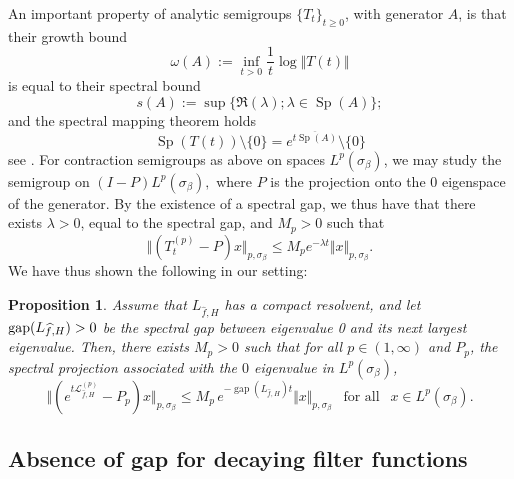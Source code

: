 \documentclass[11pt]{amsart}
\newcommand{\1}{\mathbbm{1}}
\newcommand{\cL}{\mathcal{L}}
\theoremstyle{plain}
\newtheorem{proposition}[theorem]{Proposition}
\theoremstyle{definition}
\theoremstyle{remark}
\numberwithin{equation}{section}
\begin{document}
\noindent An important property of analytic semigroups $\{T_t\}_{t\ge 0}$, with generator $A$, is that their growth bound
\[\omega(A):=\inf_{t>0} \frac{1}{t} \log \Vert T(t)\Vert\]
is equal to their spectral bound 
\[ s(A):=\sup\{\Re(\lambda); \lambda \in \operatorname{Sp}(A) \}; \]
and the spectral mapping theorem holds 
\[ \operatorname{Sp}(T(t)) \setminus \{0\} = e^{\overline{t \operatorname{Sp}(A)}} \setminus \{0\} \] 
see \cite[, Corr. 3.12]{engel1999one}. For contraction semigroups as above on spaces $L^p(\sigma_\beta)$, we may study the semigroup on $(I-P)L^p(\sigma_\beta),$ where $P$ is the projection onto the $0$ eigenspace of the generator. By the existence of a spectral gap, we thus have that there exists $\lambda>0$, equal to the spectral gap, and $M_p>0$ such that
\[\Vert (T^{(p)}_t-P)x \Vert_{p,\sigma_\beta} \le M_p e^{-\lambda t} \Vert x \Vert_{p,\sigma_\beta}. \]
 We have thus shown the following in our setting:
\begin{proposition}\label{thm:fromL2toLp}
    Assume that $L_{\widehat{f},H}$ has a compact resolvent, and let $\operatorname{gap}(L_{\smash{\widehat{f},H}})>0$ be the spectral gap between eigenvalue 0 and its next largest eigenvalue. Then, there exists $M_p>0$ such that for all $p \in (1,\infty)$ and $P_p$, the spectral projection associated with the $0$ eigenvalue in $L^p(\sigma_\beta)$,
    \[\Vert (e^{t\cL_{\widehat{f},H}^{(p)}}-P_p)x \Vert_{p,\sigma_\beta} \le M_p\, e^{-\operatorname{gap}(L_{\widehat{f},H}) t} \Vert x \Vert_{p,\sigma_\beta} ~~\text{ for all }~~ x \in L^p(\sigma_\beta). \]
\end{proposition}











































\subsection{Absence of gap for decaying filter functions}
\label{sec:AbsenceOfGap}
\end{document}
